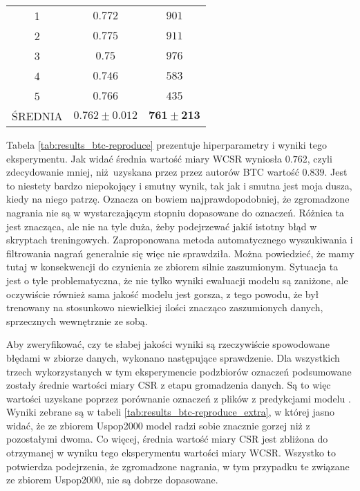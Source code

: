 \begin{table}
{\begin{tabular}{ccc}
        1                 & $0.772$    & $901$    \\
        2                 & $0.775$    & $911$    \\
        3                 & $0.75$    & $976$    \\
        4                 & $0.746$    & $583$    \\
        5                 & $0.766$    & $435$    \\ \hline
        ŚREDNIA           & $\mathbf{0.762 \pm 0.012}$ & $\mathbf{761 \pm 213}$ \\ \hline
    \end{tabular}
    }
\end{table}

Tabela \ref{tab:results_btc-reproduce} prezentuje hiperparametry i wyniki tego eksperymentu. Jak widać średnia wartość miary WCSR wyniosła $0.762$, czyli zdecydowanie mniej, niż uzyskana przez przez autorów BTC wartość $0.839$. Jest to niestety bardzo niepokojący i smutny wynik, tak jak i smutna jest moja dusza, kiedy na niego patrzę. Oznacza on bowiem najprawdopodobniej, że zgromadzone nagrania nie są w wystarczającym stopniu dopasowane do oznaczeń. Różnica ta jest znacząca, ale nie na tyle duża, żeby podejrzewać jakiś istotny błąd w skryptach treningowych. Zaproponowana metoda automatycznego wyszukiwania i filtrowania nagrań generalnie się więc nie sprawdziła. Można powiedzieć, że mamy tutaj w konsekwencji do czynienia ze zbiorem silnie zaszumionym. Sytuacja ta jest o tyle problematyczna, że nie tylko wyniki ewaluacji modelu są zaniżone, ale oczywiście również sama jakość modelu jest gorsza, z tego powodu, że był trenowany na stosunkowo niewielkiej ilości znacząco zaszumionych danych, sprzecznych wewnętrznie ze sobą.

Aby zweryfikować, czy te słabej jakości wyniki są rzeczywiście spowodowane błędami w zbiorze danych, wykonano następujące sprawdzenie. Dla wszystkich trzech wykorzystanych w tym eksperymencie podzbiorów oznaczeń podsumowane zostały średnie wartości miary CSR z etapu gromadzenia danych. Są to więc wartości uzyskane poprzez porównanie oznaczeń z plików  z predykcjami modelu \cite{korzeniowski_feature_2016}. Wyniki zebrane są w tabeli \ref{tab:results_btc-reproduce_extra}, w której jasno widać, że ze zbiorem Uspop2000 model radzi sobie znacznie gorzej niż z pozostałymi dwoma. Co więcej, średnia wartość miary CSR jest zbliżona do otrzymanej w wyniku tego eksperymentu wartości miary WCSR. Wszystko to potwierdza podejrzenia, że zgromadzone nagrania, w tym przypadku te związane ze zbiorem Uspop2000, nie są dobrze dopasowane.

